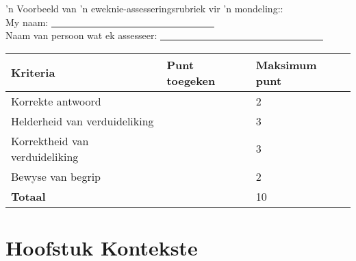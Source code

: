 'n Voorbeeld van 'n eweknie-assesseringsrubriek vir 'n mondeling::\\
My naam: \underline{~~~~~~~~~~~~~~~~~~~~~~~~~~~~~~~~~~}\\
Naam van persoon wat ek assesseer: \underline{~~~~~~~~~~~~~~~~~~~~~~~~~~~~~~~~~~}\\

\begin{table}[H]
 \begin{center}
  \begin{tabular}{|p{5cm}|p{2.5cm}|p{2.5cm}|} \hline
  \textbf{Kriteria} & \textbf{Punt toegeken} & \textbf{Maksimum punt}\\ \hline
Korrekte antwoord &&2\\ \hline
Helderheid van verduideliking&&3\\ \hline
Korrektheid van verduideliking  &&3\\ \hline
Bewyse van begrip &&2\\ \hline
\textbf{Totaal} &&10\\ \hline

  \end{tabular}

 \end{center}

\end{table}

\section{Hoofstuk Kontekste}
